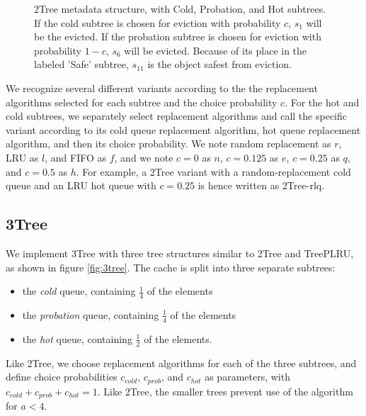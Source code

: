 \documentclass[letterpaper]{article}
\begin{document}
\begin{figure}
\begin{center}
\end{center}
  \caption{
		2Tree metadata structure, with Cold, Probation, and Hot subtrees.
		If the cold subtree is chosen for eviction with probability $c$,
		$s_1$ will be the evicted.
		If the probation subtree is chosen for eviction with probability $1 - c$,
		$s_6$ will be evicted.
		Because of its place in the labeled 'Safe' subtree,
		$s_11$ is the object safest from eviction.
	}
  \label{fig:2tree}
\end{figure}

We recognize several different variants according to the the replacement algorithms
selected for each subtree and the choice probability $c$.
For the hot and cold subtrees, we separately select replacement algorithms
and call the specific variant according to its cold queue replacement algorithm,
hot queue replacement algorithm, and then its choice probability.
We note random replacement as $r$,
LRU as $l$,
and FIFO as $f$,
and we note $c=0$ as $n$,
$c=0.125$ as $e$,
$c=0.25$ as $q$,
and $c=0.5$ as $h$.
For example, a 2Tree variant with a random-replacement cold queue
and an LRU hot queue with $c=0.25$ is hence written as 2Tree-rlq.

\subsection{3Tree}

We implement 3Tree with three tree structures similar to 2Tree and TreePLRU, as shown in figure \ref{fig:3tree}.
The cache is split into three separate subtrees:
\begin{itemize}
\item the \textit{cold} queue, containing $\frac{1}{4}$ of the elements
\item the \textit{probation} queue, containing $\frac{1}{4}$ of the elements
\item the \textit{hot} queue, containing $\frac{1}{2}$ of the elements.
\end{itemize}
Like 2Tree, we choose replacement algorithms for each of the three subtrees,
and define choice probabilities $c_{cold}$, $c_{prob}$, and $c_{hot}$ as parameters,
with $c_{cold} + c_{prob} + c_{hot} = 1$.
Like 2Tree, the smaller trees prevent use of the algorithm for $a < 4$.
\end{document}
